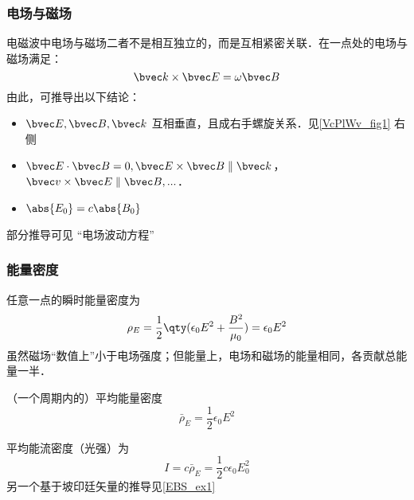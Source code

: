\subsubsection{电场与磁场}
电磁波中电场与磁场二者不是相互独立的，而是互相紧密关联．在一点处的电场与磁场满足：
\begin{equation}
\bvec k \times \bvec E = \omega \bvec B
\end{equation}
由此，可推导出以下结论：
\begin{itemize}
\item $\bvec E, \bvec B, \bvec k$ 互相垂直，且成右手螺旋关系．见\autoref{VcPlWv_fig1} 右侧
\item $\bvec E \cdot \bvec B = 0,\bvec E \times \bvec B \parallel \bvec k$，$\bvec v \times \bvec E \parallel \bvec B, ...$．
\item $\abs{E_0}=c\abs{B_0}$
\end{itemize}

部分推导可见 “电场波动方程”

\subsubsection{能量密度}
任意一点的瞬时能量密度为
\begin{equation}\label{VcPlWv_eq2}
\rho_E = \frac{1}{2}\qty(\epsilon_0 E^2 + \frac{B^2}{\mu_0}) = \epsilon_0 E^2
\end{equation}
虽然磁场“数值上”小于电场强度；但能量上，电场和磁场的能量相同，各贡献总能量一半． 

（一个周期内的）平均能量密度
\begin{equation}
\bar \rho_E = \frac{1}{2} \epsilon_0 E^2
\end{equation}

平均能流密度（光强）为
\begin{equation}
I = c \bar \rho_E = \frac12 c\epsilon_0 E_0^2
\end{equation}
另一个基于坡印廷矢量的推导见\autoref{EBS_ex1}~%


